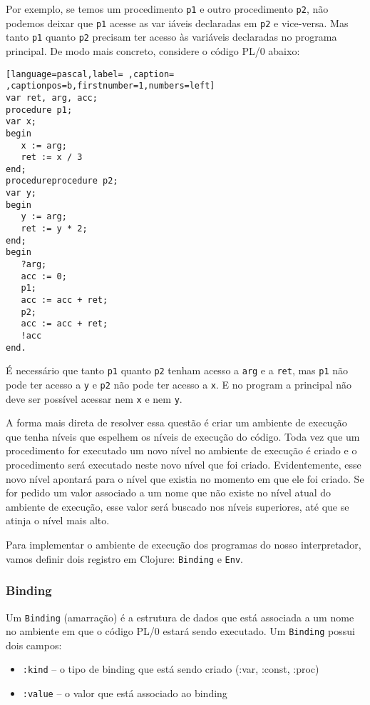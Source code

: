 \documentclass{scrartcl}
\begin{document}
Por exemplo, se temos um procedimento \texttt{p1} e outro procedimento \texttt{p2}, não
podemos deixar que \texttt{p1} acesse as var iáveis declaradas em \texttt{p2} e vice-versa.
Mas tanto \texttt{p1} quanto \texttt{p2} precisam ter acesso às variáveis declaradas no
programa principal. De modo mais concreto, considere o código PL/0 abaixo:

\begin{lstlisting}[language=pascal,label= ,caption= ,captionpos=b,firstnumber=1,numbers=left]
var ret, arg, acc;
procedure p1;
var x;
begin
   x := arg;
   ret := x / 3
end;
procedureprocedure p2;
var y;
begin
   y := arg;
   ret := y * 2;
end;
begin
   ?arg;
   acc := 0;
   p1;
   acc := acc + ret;
   p2;
   acc := acc + ret;
   !acc
end.
\end{lstlisting}

É necessário que tanto \texttt{p1} quanto \texttt{p2} tenham acesso a \texttt{arg} e a \texttt{ret}, mas
\texttt{p1} não pode ter acesso a \texttt{y} e \texttt{p2} não pode ter acesso a \texttt{x}. E no program a
principal não deve ser possível acessar nem \texttt{x} e nem \texttt{y}.

A forma mais direta de resolver essa questão é criar um ambiente de execução que
tenha níveis que espelhem os níveis de execução do código. Toda vez que um
procedimento for executado um novo nível no ambiente de execução é criado e o
procedimento será executado neste novo nível que foi criado. Evidentemente, esse
novo nível apontará para o nível que existia no momento em que ele foi criado.
Se for pedido um valor associado a um nome que não existe no nível atual do
ambiente de execução, esse valor será buscado nos níveis superiores, até que se
atinja o nível mais alto.

Para implementar o ambiente de execução dos programas do nosso interpretador,
vamos definir dois registro em Clojure: \texttt{Binding} e \texttt{Env}.

\subsubsection{Binding}
\label{sec:orga015136}

Um \texttt{Binding} (amarração) é a estrutura de dados que está associada a um nome no
ambiente em que o código PL/0 estará sendo executado. Um \texttt{Binding} possui dois
campos:
\begin{itemize}
\item \texttt{:kind} -- o tipo de binding que está sendo criado (:var, :const, :proc)
\item \texttt{:value} -- o valor que está associado ao binding
\end{itemize}
\end{document}
